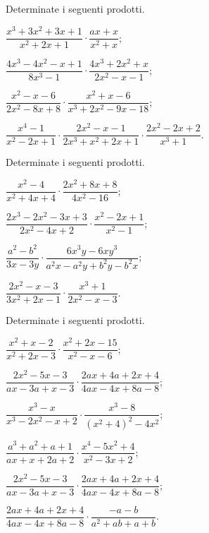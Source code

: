\begin{esercizio}[\Ast]
\label{ese:14.14}
Determinate i seguenti prodotti.
\begin{enumeratea}
 \item $\dfrac{x^{3}+3x^{2}+3x+1}{x^{2}+2x+1}\cdot \dfrac{ax+x}{x^{2}+x}$;
 \item $\dfrac{4x^{3}-4x^{2}-x+1}{8x^{3}-1}\cdot\dfrac{4x^{3}+2x^{2}+x}{2x^{2}-x-1}$;
 \item $\dfrac{x^{2}-x-6}{2x^{2}-8x+8}\cdot\dfrac{x^{2}+x-6}{x^{3}+2x^{2}-9x-18}$;
 \item $\dfrac{x^{4}-1}{x^{2}-2x+1}\cdot\dfrac{2x^{2}-x-1}{2x^{3}+x^{2}+2x+1}\cdot\dfrac{2x^{2}-2x+2}{x^{3}+1}$.
\end{enumeratea}
\end{esercizio}

\begin{esercizio}
\label{ese:14.15}
Determinate i seguenti prodotti.
\begin{multicols}{2}
\begin{enumeratea}
 \item $\dfrac{x^{2}-4}{x^{2}+4x+4}\cdot \dfrac{2x^{2}+8x+8}{4x^{2}-16}$;
 \item $\dfrac{2x^{3}-2x^{2}-3x+3}{2x^{2}-4x+2}\cdot{\dfrac{x^{2}-2x+1}{x^{2}-1}}$;
 \item $\dfrac{a^{2}-b^{2}}{3x-3y}\cdot {\dfrac{6x^{3}y-6xy^{3}}{a^{2}x-a^{2}y+b^{2}y-b^{2}x}}$;
 \item $\dfrac{2x^{2}-x-3}{3x^{2}+2x-1}\cdot {\dfrac{x^{3}+1}{2x^{2}-x-3}}$.
\end{enumeratea}
\end{multicols}
\end{esercizio}

\begin{esercizio}
\label{ese:14.16}
Determinate i seguenti prodotti.
\begin{multicols}{2}
\begin{enumeratea}
 \item $\dfrac{x^{2}+x-2}{x^{2}+2x-3}\cdot {\dfrac{x^{2}+2x-15}{x^{2}-x-6}}$;
 \item $\dfrac{2x^{2}-5x-3}{ax-3a+x-3}\cdot {\dfrac{2ax+4a+2x+4}{4ax-4x+8a-8}}$;
 \item $\dfrac{x^{3}-x}{x^{3}-2x^{2}-x+2}\cdot {\dfrac{x^{3}-8}{\left(x^{2}+4\right)^{2}-4x^{2}}}$;
 \item $\dfrac{a^{3}+a^{2}+a+1}{ax+x+2a+2}\cdot {\dfrac{x^{4}-5x^{2}+4}{x^{2}-3x+2}}$;
 \item $\dfrac{2x^{2}-5x-3}{ax-3a+x-3}\cdot {\dfrac{2ax+4a+2x+4}{4ax-4x+8a-8}}$;
 \item $\dfrac{2ax+4a+2x+4}{4ax-4x+8a-8}\cdot {\dfrac{-a-b}{a^{2}+ab+a+b}}$.
\end{enumeratea}
\end{multicols}
\end{esercizio}

